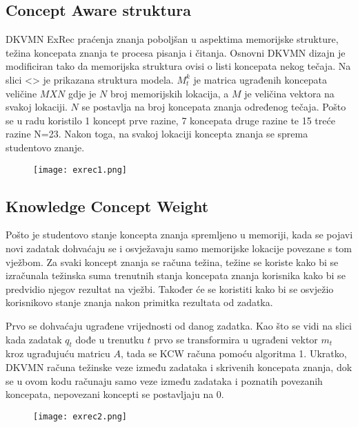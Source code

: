 \subsection{Concept Aware struktura}
DKVMN ExRec praćenja znanja poboljšan u aspektima memorijske strukture, težina koncepata znanja te procesa pisanja i čitanja. Osnovni DKVMN dizajn je modificiran tako da memorijska struktura ovisi o listi koncepata nekog tečaja. Na slici
<> je prikazana struktura modela. $M^k_t$ je matrica ugrađenih koncepata veličine $M X N$ gdje je $N$ broj memorijskih lokacija, a $M$ je veličina vektora na svakoj lokaciji. $N$ se postavlja na broj koncepata znanja određenog tečaja. Pošto se u radu koristilo 1 koncept prve razine, 7 koncepata druge razine te 15 treće razine N=23. Nakon toga, na svakoj lokaciji koncepta znanja se sprema studentovo znanje.


	\begin{figure}[!htb]
	\centering
	\texttt{[image: exrec1.png]}
	\caption{}
	\label{}
\end{figure}


\subsection{Knowledge Concept Weight}

Pošto je studentovo stanje koncepta znanja spremljeno u memoriji, kada se pojavi novi zadatak dohvaćaju se i osvježavaju samo memorijske lokacije povezane s tom vježbom. Za svaki koncept znanja se računa težina, težine se koriste kako bi se izračunala težinska suma trenutnih stanja koncepata znanja korisnika kako bi se predvidio njegov rezultat na vježbi. Također će se koristiti kako bi se osvježio korisnikovo stanje znanja nakon primitka rezultata od zadatka.

Prvo se dohvaćaju ugrađene vrijednosti od danog zadatka. Kao što se vidi na slici kada zadatak $q_t$ dođe u trenutku $t$ prvo se transformira u ugrađeni vektor $m_t$ kroz ugrađujuću matricu $A$, tada se KCW računa pomoću algoritma 1. Ukratko, DKVMN računa težinske veze između zadataka i skrivenih koncepata znanja, dok se u ovom kodu računaju samo veze između zadataka i poznatih povezanih koncepata, nepovezani koncepti se postavljaju na 0.


	\begin{figure}[!htb]
	\centering
	\texttt{[image: exrec2.png]}
	\caption{}
	\label{}
\end{figure}



